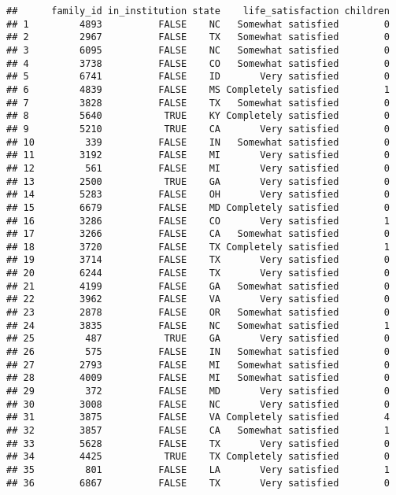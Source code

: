 \documentclass[]{book}
\theoremstyle{definition}
\theoremstyle{definition}
\theoremstyle{remark}
\begin{document}
\begin{verbatim}
##      family_id in_institution state    life_satisfaction children
## 1         4893          FALSE    NC   Somewhat satisfied        0
## 2         2967          FALSE    TX   Somewhat satisfied        0
## 3         6095          FALSE    NC   Somewhat satisfied        0
## 4         3738          FALSE    CO   Somewhat satisfied        0
## 5         6741          FALSE    ID       Very satisfied        0
## 6         4839          FALSE    MS Completely satisfied        1
## 7         3828          FALSE    TX   Somewhat satisfied        0
## 8         5640           TRUE    KY Completely satisfied        0
## 9         5210           TRUE    CA       Very satisfied        0
## 10         339          FALSE    IN   Somewhat satisfied        0
## 11        3192          FALSE    MI       Very satisfied        0
## 12         561          FALSE    MI       Very satisfied        0
## 13        2500           TRUE    GA       Very satisfied        0
## 14        5283          FALSE    OH       Very satisfied        0
## 15        6679          FALSE    MD Completely satisfied        0
## 16        3286          FALSE    CO       Very satisfied        1
## 17        3266          FALSE    CA   Somewhat satisfied        0
## 18        3720          FALSE    TX Completely satisfied        1
## 19        3714          FALSE    TX       Very satisfied        0
## 20        6244          FALSE    TX       Very satisfied        0
## 21        4199          FALSE    GA   Somewhat satisfied        0
## 22        3962          FALSE    VA       Very satisfied        0
## 23        2878          FALSE    OR   Somewhat satisfied        0
## 24        3835          FALSE    NC   Somewhat satisfied        1
## 25         487           TRUE    GA       Very satisfied        0
## 26         575          FALSE    IN   Somewhat satisfied        0
## 27        2793          FALSE    MI   Somewhat satisfied        0
## 28        4009          FALSE    MI   Somewhat satisfied        0
## 29         372          FALSE    MD       Very satisfied        0
## 30        3008          FALSE    NC       Very satisfied        0
## 31        3875          FALSE    VA Completely satisfied        4
## 32        3857          FALSE    CA   Somewhat satisfied        1
## 33        5628          FALSE    TX       Very satisfied        0
## 34        4425           TRUE    TX Completely satisfied        0
## 35         801          FALSE    LA       Very satisfied        1
## 36        6867          FALSE    TX       Very satisfied        0

\end{verbatim}
\end{document}
